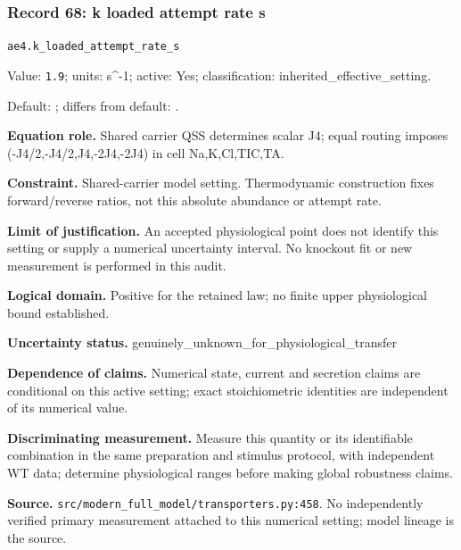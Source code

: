 \subsubsection*{Record 68: k loaded attempt rate s}
{\small \nolinkurl{ae4.k_loaded_attempt_rate_s}\par

Value: \texttt{1.9}; units: s\textasciicircum{}-1; active: Yes; classification: inherited\_effective\_setting.\par

Default: ; differs from default: .\par

\textbf{Equation role.} Shared carrier QSS determines scalar J4; equal routing imposes (-J4/2,-J4/2,J4,-2J4,-2J4) in cell Na,K,Cl,TIC,TA.\par

\textbf{Constraint.} Shared-carrier model setting. Thermodynamic construction fixes forward/reverse ratios, not this absolute abundance or attempt rate.\par

\textbf{Limit of justification.} An accepted physiological point does not identify this setting or supply a numerical uncertainty interval. No knockout fit or new measurement is performed in this audit.\par

\textbf{Logical domain.} Positive for the retained law; no finite upper physiological bound established.\par

\textbf{Uncertainty status.} genuinely\_unknown\_for\_physiological\_transfer\par

\textbf{Dependence of claims.} Numerical state, current and secretion claims are conditional on this active setting; exact stoichiometric identities are independent of its numerical value.\par

\textbf{Discriminating measurement.} Measure this quantity or its identifiable combination in the same preparation and stimulus protocol, with independent WT data; determine physiological ranges before making global robustness claims.\par

\textbf{Source.} \nolinkurl{src/modern_full_model/transporters.py:458}. No independently verified primary measurement attached to this numerical setting; model lineage is the source.\par}

